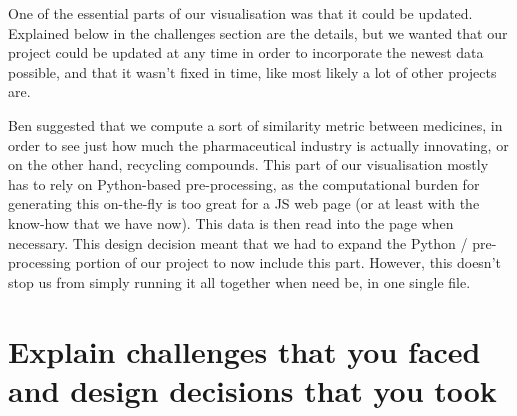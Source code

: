 \documentclass{article}
\begin{document}
One of the essential parts of our visualisation was that it could be updated. Explained below in the challenges section are the details, but we wanted that our project could be updated at any time in order to incorporate the newest data possible, and that it wasn't fixed in time, like most likely a lot of other projects are.

Ben suggested that we compute a sort of similarity metric between medicines, in order to see just how much the pharmaceutical industry is actually innovating, or on the other hand, recycling compounds. This part of our visualisation mostly has to rely on Python-based pre-processing, as the computational burden for generating this on-the-fly is too great for a JS web page (or at least with the know-how that we have now). This data is then read into the page when necessary. This design decision meant that we had to expand the Python / pre-processing portion of our project to now include this part. However, this doesn't stop us from simply running it all together when need be, in one single file.

\section{Explain challenges that you faced and design decisions that you took}
\end{document}

